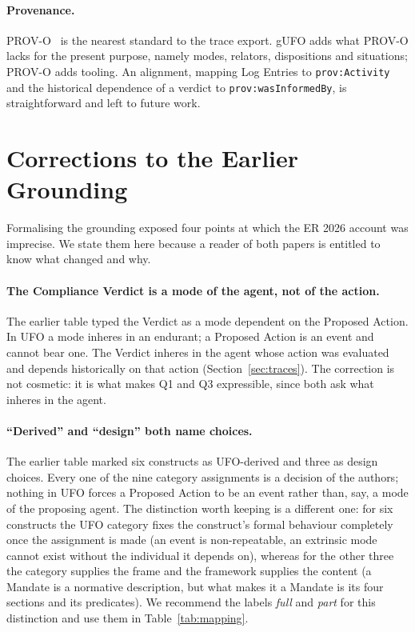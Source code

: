 \documentclass[runningheads]{llncs}
\newcommand{\code}[1]{\texttt{#1}}
\begin{document}
\paragraph{Provenance.}
PROV-O~\cite{provo2013} is the nearest standard to the trace export. gUFO adds what PROV-O lacks for the present purpose, namely modes, relators, dispositions and situations; PROV-O adds tooling. An alignment, mapping Log Entries to \code{prov:Activity} and the historical dependence of a verdict to \code{prov:wasInformedBy}, is straightforward and left to future work.

\section{Corrections to the Earlier Grounding}
\label{sec:corrections}
Formalising the grounding exposed four points at which the ER 2026 account was imprecise. We state them here because a reader of both papers is entitled to know what changed and why.

\paragraph{The Compliance Verdict is a mode of the agent, not of the action.}
The earlier table typed the Verdict as a mode dependent on the Proposed Action. In UFO a mode inheres in an endurant; a Proposed Action is an event and cannot bear one. The Verdict inheres in the agent whose action was evaluated and depends historically on that action (Section~\ref{sec:traces}). The correction is not cosmetic: it is what makes Q1 and Q3 expressible, since both ask what inheres in the agent.

\paragraph{``Derived'' and ``design'' both name choices.}
The earlier table marked six constructs as UFO-derived and three as design choices. Every one of the nine category assignments is a decision of the authors; nothing in UFO forces a Proposed Action to be an event rather than, say, a mode of the proposing agent. The distinction worth keeping is a different one: for six constructs the UFO category fixes the construct's formal behaviour completely once the assignment is made (an event is non-repeatable, an extrinsic mode cannot exist without the individual it depends on), whereas for the other three the category supplies the frame and the framework supplies the content (a Mandate is a normative description, but what makes it a Mandate is its four sections and its predicates). We recommend the labels \emph{full} and \emph{part} for this distinction and use them in Table~\ref{tab:mapping}.
\end{document}
